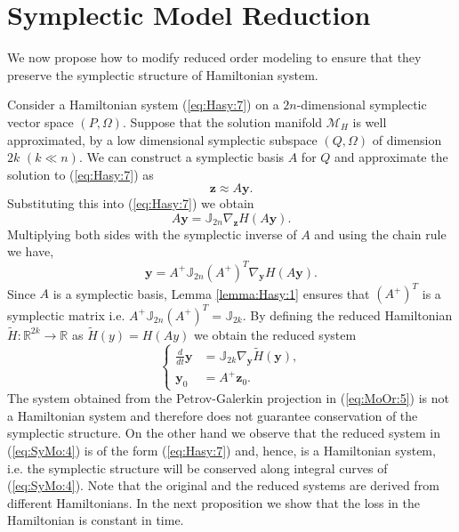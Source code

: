 \section{Symplectic Model Reduction} \label{chap:SyMo:1}
We now propose how to modify reduced order modeling to ensure that they preserve the symplectic structure of Hamiltonian system. 


Consider a Hamiltonian system (\ref{eq:Hasy:7}) on a $2n$-dimensional symplectic vector space $(P,\Omega)$. Suppose that the solution manifold $\mathcal M_H$ is well approximated, by a low dimensional symplectic subspace $(Q,\Omega)$ of dimension $2k$ $(k\ll n)$. We can construct a symplectic basis $A$ for $Q$ and approximate the solution to (\ref{eq:Hasy:7}) as
\begin{equation} \label{eq:SyMo:1}
	\mathbf z \approx A\mathbf y.
\end{equation}
Substituting this into (\ref{eq:Hasy:7}) we obtain
\begin{equation} \label{eq:SyMo:2}
	A\mathbf y = \mathbb{J}_{2n} \nabla_{\mathbf z} H(A \mathbf y). 
\end{equation}
Multiplying both sides with the symplectic inverse of $A$ and using the chain rule we have,
\begin{equation} \label{eq:SyMo:3}
	\mathbf y = A^+ \mathbb J_{2n} (A^+)^T \nabla_{\mathbf y} H(A\mathbf y).
\end{equation}
Since $A$ is a symplectic basis, Lemma \ref{lemma:Hasy:1} ensures that $(A^+)^T$ is a symplectic matrix i.e. $A^+ \mathbb J_{2n} (A^+)^T = \mathbb{J}_{2k}$. By defining the reduced Hamiltonian $\tilde H:\mathbb R^{2k} \to \mathbb R$ as $\tilde H (y) = H(Ay)$ we obtain the reduced system
\begin{equation} \label{eq:SyMo:4}
\left\{
\begin{aligned}
	 \frac{d}{dt} \mathbf y &= \mathbb J_{2k} \nabla_{\mathbf y} \tilde H(\mathbf y), \\
	 \mathbf y_0 &= A^+ \mathbf z_0.
\end{aligned}
\right.
\end{equation}
The system obtained from the Petrov-Galerkin projection in (\ref{eq:MoOr:5}) is not a Hamiltonian system and therefore does not guarantee conservation of the symplectic structure. On the other hand we observe that the reduced system in (\ref{eq:SyMo:4}) is of the form (\ref{eq:Hasy:7}) and, hence, is a Hamiltonian system, i.e. the symplectic structure will be conserved along integral curves of (\ref{eq:SyMo:4}). Note that the original and the reduced systems are derived from different Hamiltonians. In the next proposition we show that the loss in the Hamiltonian is constant in time. 


